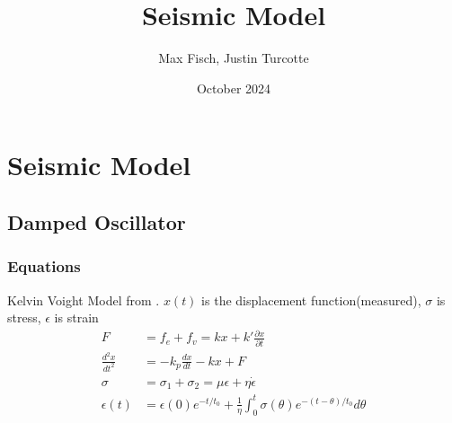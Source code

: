 \documentclass{article}
\title{Seismic Model}
\author{Max Fisch, Justin Turcotte}
\date{October 2024}
\begin{document}
\maketitle
\tableofcontents
\newpage
\section{Seismic Model}
\subsection{Damped Oscillator}
\subsubsection{Equations}
Kelvin Voight Model from \cite{seismic}.
$x(t)$ is the displacement function(measured), $\sigma$ is stress, $\epsilon$ is strain
\begin{align}
  F &= f_e + f_v = kx + k'\frac{\partial x}{\partial t}\\
  \frac{d^2x}{dt^2} &= -k_p\frac{dx}{dt} -kx + F\\
  \sigma &= \sigma_1 + \sigma_2 = \mu\epsilon + \eta\dot{\epsilon}\\
  \epsilon(t) &= \epsilon(0)e^{-t/t_0} + \frac{1}{\eta}\int_0^t\sigma(\theta)e^{-\left(t-\theta\right)/t_0}d\theta
\end{align}

\newpage
\printbibliography
\end{document}
